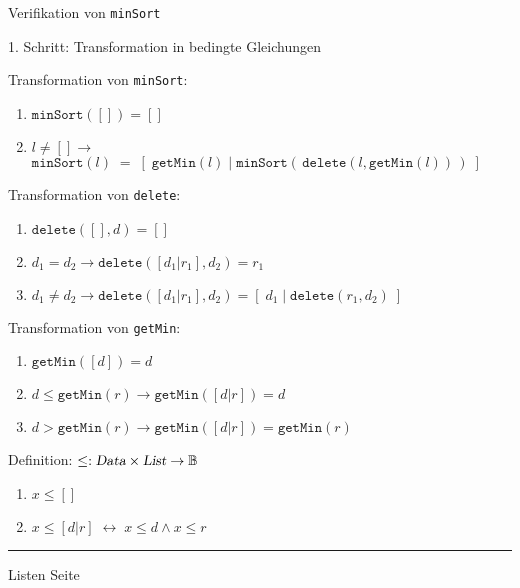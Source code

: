 
\begin{slide}{}
\normalsize

\begin{center}
Verifikation von \texttt{minSort}
\end{center}
\vspace*{0.5cm}

\footnotesize
1. Schritt: Transformation in bedingte Gleichungen

Transformation von \texttt{minSort}:
\begin{enumerate}
\item $\mathtt{minSort}([]) = []$
\item $l \not=[] \rightarrow $\\[0.3cm]
      $\mathtt{minSort}(l) \;=\; [\; \mathtt{getMin}(l) \;|\; \mathtt{minSort}(\,\mathtt{delete}(l, \mathtt{getMin}(l))\,)\;]$
\end{enumerate}
Transformation von \texttt{delete}:
\begin{enumerate}
\item $\texttt{delete}([],d) = []$
\item $d_1 = d_2 \rightarrow \mathtt{delete}([d_1|r_1], d_2) = r_1$
\item $d_1 \not= d_2 \rightarrow \mathtt{delete}([d_1|r_1], d_2) = [\;d_1 \;|\; \mathtt{delete}(r_1, d_2)\;]$
\end{enumerate}
Transformation von \texttt{getMin}:
\begin{enumerate}
\item $\mathtt{getMin}([d]) = d$
\item $d \leq \mathtt{getMin}(r) \rightarrow \mathtt{getMin}([d|r]) = d$
\item $d >    \mathtt{getMin}(r) \rightarrow \mathtt{getMin}([d|r]) = \mathtt{getMin}(r)$
\end{enumerate}
Definition: $\leq : \textsl{Data} \times \textsl{List} \rightarrow \mathbb{B}$
\begin{enumerate}
\item $x \leq []$
\item $x \leq [d|r] \;\leftrightarrow\; x \leq d \wedge x \leq r$
\end{enumerate}

\vspace*{\fill}
\tiny \addtocounter{mypage}{1}
\rule{17cm}{1mm}
Listen  \hspace*{\fill} Seite 
\end{slide}

